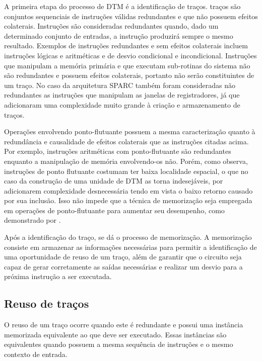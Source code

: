 A primeira etapa do processo de DTM é a identificação de traços. traços são conjuntos sequenciais de instruções válidas redundantes e que não possuem efeitos colaterais. Instruções são consideradas redundantes quando, dado um determinado conjunto de entradas, a instrução produzirá sempre o mesmo resultado. Exemplos de instruções redundantes e sem efeitos colaterais incluem instruções lógicas e aritméticas e de desvio condicional e incondicional. Instruções que manipulam a memória primária e que executam sub-rotinas do sistema não são redundantes e possuem efeitos colaterais, portanto não serão constituintes de um traço. No caso da arquitetura SPARC também foram consideradas não redundantes as instruções que manipulam as janelas de registradores, já que adicionaram uma complexidade muito grande à criação e armazenamento de traços.

Operações envolvendo ponto-flutuante possuem a mesma caracterização quanto à redundância e causalidade de efeitos colaterais que as instruções citadas acima. Por exemplo, instruções aritméticas com ponto-flutuante são redundantes enquanto a manipulação de memória envolvendo-os não. Porém, como  observa, instruções de ponto flutuante costumam ter baixa localidade espacial, o que no caso da construção de uma unidade de DTM as torna indesejáveis, por adicionarem complexidade desnecessária tendo em vista o baixo retorno causado por sua inclusão. Isso não impede que a técnica de memorização seja empregada em operações de ponto-flutuante para aumentar seu desempenho, como demonstrado por .

Após a identificação do traço, se dá o processo de memorização. A memorização consiste em armazenar as informações necessárias para permitir a identificação de uma oportunidade de reuso de um traço, além de garantir que o circuito seja capaz de gerar corretamente as saídas necessárias e realizar um desvio para a próxima instrução a ser executada.



\subsection{Reuso de traços}
\label{Fundamentacao:DTM:Reuso}

O reuso de um traço ocorre quando este é redundante e possui uma instância memorizada equivalente ao que deve ser executado. Essas instâncias são equivalentes quando possuem a mesma sequência de instruções e o mesmo contexto de entrada.

